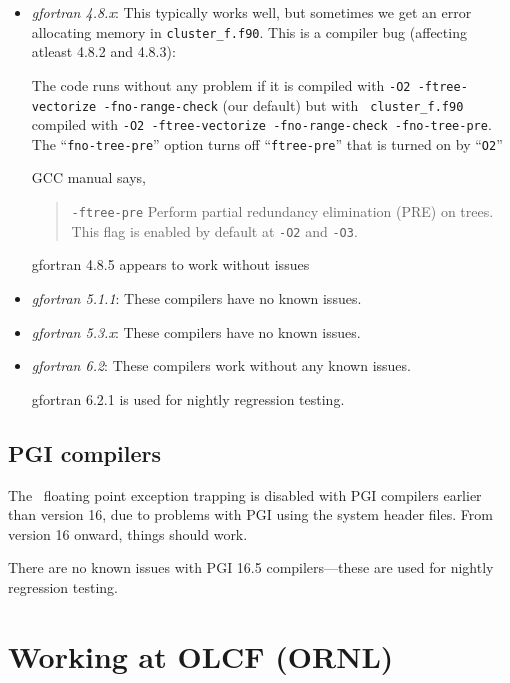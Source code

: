 \begin{itemize}

\item {\em gfortran 4.8.x}: This typically works well, but sometimes we get
an error allocating memory in {\tt cluster\_f.f90}.  This
is a compiler bug (affecting atleast 4.8.2 and 4.8.3):

The code runs without any problem if it is compiled with {\tt -O2
-ftree-vectorize -fno-range-check} (our default) but with {\tt
cluster\_f.f90} compiled with {\tt -O2 -ftree-vectorize
-fno-range-check -fno-tree-pre}.  The ``{\tt fno-tree-pre}'' option
turns off ``{\tt ftree-pre}'' that is turned on by ``{\tt O2}''
 
GCC manual says,

\begin{quote}
{\tt -ftree-pre} \newline
Perform partial redundancy elimination (PRE) on trees. This flag is enabled by default at {\tt -O2} and {\tt -O3}.
\end{quote}

gfortran 4.8.5 appears to work without issues


\item {\em gfortran 5.1.1}: These compilers have no known issues.

\item {\em gfortran 5.3.x}: These compilers have no known issues.

\item {\em gfortran 6.2}: These compilers work without any known issues.

  gfortran 6.2.1 is used for nightly regression testing.

\end{itemize}

\subsection{PGI compilers}

The \fboxlib\ floating point exception trapping is disabled with PGI
compilers earlier than version 16, due to problems with PGI using the
system header files.  From version 16 onward, things should work.

There are no known issues with PGI 16.5 compilers---these are used
for nightly regression testing.


\section{Working at OLCF (ORNL)}

